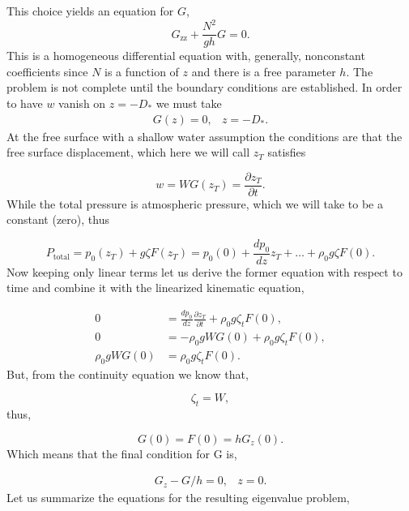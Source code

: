 \documentclass[11pt]{article}
\begin{document}
This choice yields an equation for $G$,
\begin{equation*}
G_\textrm{zz}+\frac{N^2}{g h} G = 0.
\end{equation*}
This is a homogeneous differential equation with, generally, nonconstant coefficients since $N$ is a function of $z$ and there is a free parameter $h$. The problem is not complete until the boundary conditions are established.
In order to have $w$ vanish on $z=-D_*$ we must take
\begin{equation*}
\begin{array}{cc}
G(z) = 0,& z = -D_*.
\end{array}
\end{equation*}
At the free surface with a shallow water assumption the conditions are that the free surface displacement, which here we will call $z_T$ satisfies

\begin{equation*}
w=W G(z_T)=\frac{\partial z_T}{\partial t}.
\end{equation*}
While the total pressure is atmospheric pressure, which we will take to be a constant (zero), thus

\begin{equation*}
P_\textrm{total}=p_0(z_T)+g \zeta F(z_T)=p_0(0)+\frac{d p_0}{d z}z_T+\ldots+\rho_0 g \zeta F(0).
\end{equation*}
Now keeping only linear terms let us derive the former equation with respect to time and combine it with the linearized kinematic equation,

\begin{align*}
0 &= \frac{d p_0}{d z}\frac{\partial z_T}{\partial t}+\rho_0 g \zeta_t F(0), \\
0 &= -\rho_0 g W G(0)+\rho_0 g \zeta_t F(0), \\
\rho_0 g W G(0) &= \rho_0 g \zeta_t F(0).
\end{align*}
But, from the continuity equation we know that,

\begin{equation*}
\zeta_t = W,
\end{equation*}
thus,

\begin{equation*}
G(0)=F(0)=h G_z(0).
\end{equation*}
Which means that the final condition for G is,

\begin{equation*}
\begin{array}{cc}
G_z-G/h=0,& z = 0.
\end{array}
\end{equation*}
Let us summarize the equations for the resulting eigenvalue problem,
\end{document}

